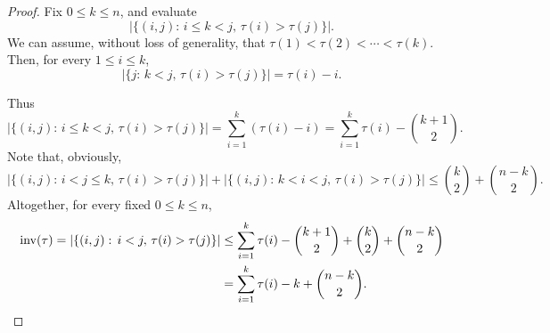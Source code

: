 \documentclass[10pt,a4paper]{amsart}
\newcommand{\inv}{{\operatorname{inv}}}
\newcommand{\todo}[1]{\vspace{5 mm}\par \noindent
\marginpar{\textsc{ToDo}} \framebox{\begin{minipage}[c]{0.95
\textwidth}
 #1 \end{minipage}}\vspace{5 mm}\par}
\begin{document}
\begin{proof} 
Fix $0\le k\le n$, and evaluate 
\[
   |\{(i,j) :\, i\le k<j,\, \tau(i)>\tau(j)\}|. 
\]
We can assume, without loss of generality, that $\tau(1)<\tau(2)<\cdots<\tau(k)$. 
Then, for every $1\le i\le k$,
\[
    |\{j :\, k<j,\, \tau(i)>\tau(j)\}|=\tau(i)-i.
\]


Thus  
\[
   |\{(i,j) :\, i\le k<j,\, \tau(i)>\tau(j)\}| 
   = \sum_{i=1}^k (\tau(i)-i)
   = \sum_{i=1}^k \tau(i) - \binom{k+1}{2}.
\]
Note that, obviously, 
\[
    |\{(i,j) :\, i< j \le k,\, \tau(i)>\tau(j)\}| +
    |\{(i,j) :\, k < i < j,\, \tau(i)>\tau(j)\}|
    \le \binom{k}{2} + \binom{n-k}{2}. 
\]
Altogether, 
for every fixed $0\le k\le n$,
\begin{align*}
    \inv(\tau)
    = |\{(i,j) :\, i<j,\, \tau(i)>\tau(j)\}| 
    &\le \sum_{i=1}^k \tau(i) - \binom{k+1}{2} + \binom{k}{2} + \binom{n-k}{2} \\
    &= \sum_{i=1}^k \tau(i) - k + \binom{n-k}{2}.
    \qedhere
\end{align*}
\end{proof}
\end{document}
